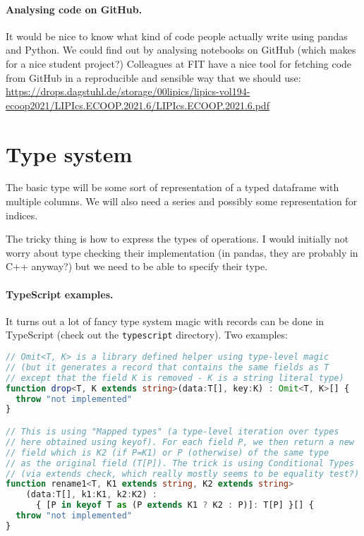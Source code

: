 \documentclass{article}
\begin{document}
\paragraph{Analysing code on GitHub.}
It would be nice to know what kind of code people actually write using pandas and Python. We could find out by analysing notebooks on GitHub (which makes for a nice student project?) Colleagues at FIT have a nice tool for fetching code from GitHub in a reproducible and sensible way that we should use: \url{https://drops.dagstuhl.de/storage/00lipics/lipics-vol194-ecoop2021/LIPIcs.ECOOP.2021.6/LIPIcs.ECOOP.2021.6.pdf}

\section{Type system}
The basic type will be some sort of representation of a typed dataframe with multiple columns. We will also need a series and possibly some representation for indices.

The tricky thing is how to express the types of operations. I would initially not worry about type checking their implementation (in pandas, they are probably in C++ anyway?) but we need to be able to specify their type.

\vspace{-0.3em}
\paragraph{TypeScript examples.}
It turns out a lot of fancy type system magic with records can be done in TypeScript (check out the \texttt{typescript} directory). Two examples:

\begin{lstlisting}[language=TypeScript]
// Omit<T, K> is a library defined helper using type-level magic
// (but it generates a record that contains the same fields as T
// except that the field K is removed - K is a string literal type)
function drop<T, K extends string>(data:T[], key:K) : Omit<T, K>[] {
  throw "not implemented"
}

// This is using "Mapped types" (a type-level iteration over types
// here obtained using keyof). For each field P, we then return a new
// field which is K2 (if P=K1) or P (otherwise) of the same type
// as the original field (T[P]). The trick is using Conditional Types
// (via extends check, which really mostly seems to be equality test?)
function rename1<T, K1 extends string, K2 extends string>
    (data:T[], k1:K1, k2:K2) :
      { [P in keyof T as (P extends K1 ? K2 : P)]: T[P] }[] {
  throw "not implemented"
}
\end{lstlisting}
\end{document}
